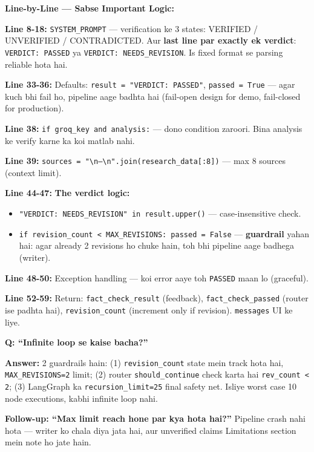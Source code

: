 \documentclass[11pt, a4paper]{article}
\begin{document}
\begin{codestorybox}
\textbf{Line-by-Line --- Sabse Important Logic:}

\textbf{Line 8-18:} \texttt{SYSTEM\_PROMPT} --- verification ke 3 states: VERIFIED / UNVERIFIED / CONTRADICTED. Aur \textbf{last line par exactly ek verdict}: \texttt{VERDICT: PASSED} ya \texttt{VERDICT: NEEDS\_REVISION}. Is fixed format se parsing reliable hota hai.

\textbf{Line 33-36:} Defaults: \texttt{result = "VERDICT: PASSED"}, \texttt{passed = True} --- agar kuch bhi fail ho, pipeline aage badhta hai (fail-open design for demo, fail-closed for production).

\textbf{Line 38:} \texttt{if groq\_key and analysis:} --- dono condition zaroori. Bina analysis ke verify karne ka koi matlab nahi.

\textbf{Line 39:} \texttt{sources = "\textbackslash n---\textbackslash n".join(research\_data[:8])} --- max 8 sources (context limit).

\textbf{Line 44-47:} \textbf{The verdict logic:}
\begin{itemize}
\item \texttt{"VERDICT: NEEDS\_REVISION" in result.upper()} --- case-insensitive check.
\item \texttt{if revision\_count < MAX\_REVISIONS: passed = False} --- \textbf{guardrail} yahan hai: agar already 2 revisions ho chuke hain, toh bhi pipeline aage badhega (writer).
\end{itemize}

\textbf{Line 48-50:} Exception handling --- koi error aaye toh \texttt{PASSED} maan lo (graceful).

\textbf{Line 52-59:} Return: \texttt{fact\_check\_result} (feedback), \texttt{fact\_check\_passed} (router ise padhta hai), \texttt{revision\_count} (increment only if revision). \texttt{messages} UI ke liye.
\end{codestorybox}

\begin{interviewbox}
\textbf{Q: ``Infinite loop se kaise bacha?''}

\textbf{Answer:} 2 guardrails hain: (1) \texttt{revision\_count} state mein track hota hai, \texttt{MAX\_REVISIONS=2} limit; (2) router \texttt{should\_continue} check karta hai \texttt{rev\_count < 2}; (3) LangGraph ka \texttt{recursion\_limit=25} final safety net. Isliye worst case 10 node executions, kabhi infinite loop nahi.

\textbf{Follow-up: ``Max limit reach hone par kya hota hai?''} Pipeline crash nahi hota --- writer ko chala diya jata hai, aur unverified claims Limitations section mein note ho jate hain.
\end{interviewbox}
\end{document}
